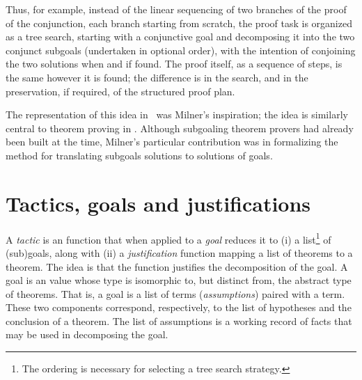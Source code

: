 Thus, for example, instead of
the linear sequencing of two branches of the proof of the conjunction,
each branch starting from scratch, the proof task is organized
as a tree search, starting with a conjunctive goal
and decomposing it into the two conjunct subgoals (undertaken in optional
order), with the intention of conjoining the two solutions when and if found.
The proof itself, as a sequence of steps, is the same however it is found;
the difference is in the search, and in the preservation, if required, of
the structured proof plan.

The representation of this idea in \LCF\ was Milner's inspiration;
the idea is similarly central to theorem proving in \HOL.
Although subgoaling theorem provers had already been built at the time,
Milner's particular contribution was in formalizing the method for
translating subgoals solutions to solutions of goals.




\section{Tactics, goals and justifications}
\label{tactics}

A \emph{tactic}%
is an \ML{} function that when applied to a \emph{goal}
reduces it to (i) a list\footnote{The ordering is necessary for selecting
a tree search strategy.} of
(sub)goals, along with (ii) a \emph{justification}
function mapping a list of theorems to a theorem.  The idea is that
the function justifies the decomposition of the goal.
A goal is an \ML{} value whose type is isomorphic
to, but distinct from, the \ML{} abstract type  of theorems.
That is, a goal is
a list of terms ({\it assumptions\/})
 paired with a term.
These two components correspond, respectively, to the list of hypotheses
and the conclusion of a theorem. The list of assumptions is a working
record of facts that may be used in decomposing the goal.

